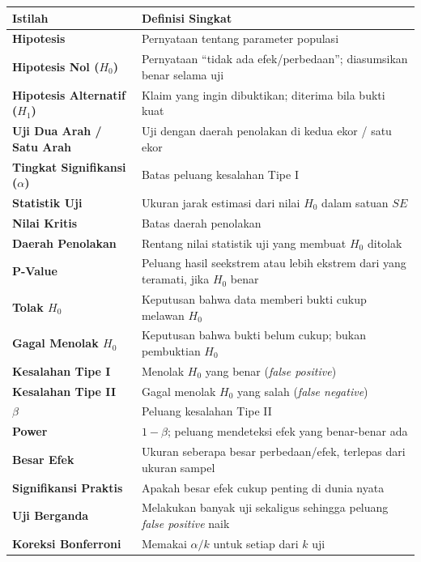 \documentclass[
  indonesian,
  letterpaper,
]{book}
\newcounter{none} %
\begin{document}
{\def\LTcaptype{none} %
\begin{longtable}[]{@{}
  >{\raggedright\arraybackslash}p{}
  >{\raggedright\arraybackslash}p{}@{}}
\toprule\noalign{}
\begin{minipage}[b]{\linewidth}\raggedright
Istilah
\end{minipage} & \begin{minipage}[b]{\linewidth}\raggedright
Definisi Singkat
\end{minipage} \\
\midrule\noalign{}
\endhead
\bottomrule\noalign{}
\endlastfoot
\textbf{Hipotesis} & Pernyataan tentang parameter populasi \\
\textbf{Hipotesis Nol (\(H_0\))} & Pernyataan ``tidak ada
efek/perbedaan''; diasumsikan benar selama uji \\
\textbf{Hipotesis Alternatif (\(H_1\))} & Klaim yang ingin dibuktikan;
diterima bila bukti kuat \\
\textbf{Uji Dua Arah / Satu Arah} & Uji dengan daerah penolakan di kedua
ekor / satu ekor \\
\textbf{Tingkat Signifikansi (\(\alpha\))} & Batas peluang kesalahan
Tipe I \\
\textbf{Statistik Uji} & Ukuran jarak estimasi dari nilai \(H_0\) dalam
satuan \(SE\) \\
\textbf{Nilai Kritis} & Batas daerah penolakan \\
\textbf{Daerah Penolakan} & Rentang nilai statistik uji yang membuat
\(H_0\) ditolak \\
\textbf{P-Value} & Peluang hasil seekstrem atau lebih ekstrem dari yang
teramati, jika \(H_0\) benar \\
\textbf{Tolak \(H_0\)} & Keputusan bahwa data memberi bukti cukup
melawan \(H_0\) \\
\textbf{Gagal Menolak \(H_0\)} & Keputusan bahwa bukti belum cukup;
bukan pembuktian \(H_0\) \\
\textbf{Kesalahan Tipe I} & Menolak \(H_0\) yang benar (\emph{false
positive}) \\
\textbf{Kesalahan Tipe II} & Gagal menolak \(H_0\) yang salah
(\emph{false negative}) \\
\textbf{\(\beta\)} & Peluang kesalahan Tipe II \\
\textbf{Power} & \(1 - \beta\); peluang mendeteksi efek yang benar-benar
ada \\
\textbf{Besar Efek} & Ukuran seberapa besar perbedaan/efek, terlepas
dari ukuran sampel \\
\textbf{Signifikansi Praktis} & Apakah besar efek cukup penting di dunia
nyata \\
\textbf{Uji Berganda} & Melakukan banyak uji sekaligus sehingga peluang
\emph{false positive} naik \\
\textbf{Koreksi Bonferroni} & Memakai \(\alpha / k\) untuk setiap dari
\(k\) uji \\
\end{longtable}
}
\end{document}
